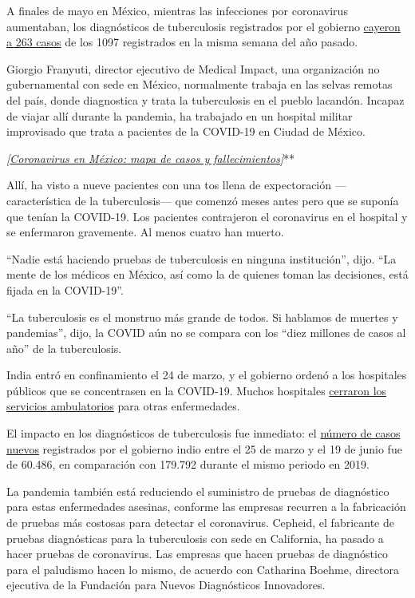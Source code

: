 A finales de mayo en México, mientras las infecciones por coronavirus
aumentaban, los diagnósticos de tuberculosis registrados por el gobierno
\href{https://www.gob.mx/salud/acciones-y-programas/direccion-general-de-epidemiologia-boletin-epidemiologico}{cayeron
a 263 casos} de los 1097 registrados en la misma semana del año pasado.

Giorgio Franyuti, director ejecutivo de Medical Impact, una organización
no gubernamental con sede en México, normalmente trabaja en las selvas
remotas del país, donde diagnostica y trata la tuberculosis en el pueblo
lacandón. Incapaz de viajar allí durante la pandemia, ha trabajado en un
hospital militar improvisado que trata a pacientes de la COVID-19 en
Ciudad de México.

\emph{\emph{\emph{{[}}\href{https://www.nytimes3xbfgragh.onion/es/interactive/2020/espanol/america-latina/coronavirus-en-mexico.html?action=click\&module=RelatedLinks\&pgtype=Article}{\emph{Coronavirus
en México: mapa de casos y fallecimientos}}}{]}}**

Allí, ha visto a nueve pacientes con una tos llena de expectoración
---característica de la tuberculosis--- que comenzó meses antes pero que
se suponía que tenían la COVID-19. Los pacientes contrajeron el
coronavirus en el hospital y se enfermaron gravemente. Al menos cuatro
han muerto.

``Nadie está haciendo pruebas de tuberculosis en ninguna institución'',
dijo. ``La mente de los médicos en México, así como la de quienes toman
las decisiones, está fijada en la COVID-19''.

``La tuberculosis es el monstruo más grande de todos. Si hablamos de
muertes y pandemias'', dijo, la COVID aún no se compara con los ``diez
millones de casos al año'' de la tuberculosis.

India entró en confinamiento el 24 de marzo, y el gobierno ordenó a los
hospitales públicos que se concentrasen en la COVID-19. Muchos
hospitales
\href{https://timesofindia.indiatimes.com/india/how-covid-war-is-hurting-indias-non-covid-patients/articleshow/74949121.cms}{cerraron
los servicios ambulatorios} para otras enfermedades.

El impacto en los diagnósticos de tuberculosis fue inmediato: el
\href{https://reports.nikshay.in/Reports/TBNotification}{número de casos
nuevos} registrados por el gobierno indio entre el 25 de marzo y el 19
de junio fue de 60.486, en comparación con 179.792 durante el mismo
periodo en 2019.

La pandemia también está reduciendo el suministro de pruebas de
diagnóstico para estas enfermedades asesinas, conforme las empresas
recurren a la fabricación de pruebas más costosas para detectar el
coronavirus. Cepheid, el fabricante de pruebas diagnósticas para la
tuberculosis con sede en California, ha pasado a hacer pruebas de
coronavirus. Las empresas que hacen pruebas de diagnóstico para el
paludismo hacen lo mismo, de acuerdo con Catharina Boehme, directora
ejecutiva de la Fundación para Nuevos Diagnósticos Innovadores.

